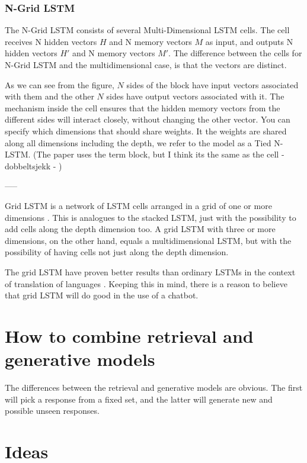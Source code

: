 \documentclass{article} %
\begin{document}
\subsubsection{N-Grid LSTM}
The N-Grid LSTM consists of several Multi-Dimensional LSTM cells. The cell receives N hidden vectors $H$ and N memory vectors $M$ as input, and outputs N hidden vectors $H'$ and N memory vectors $M'$. The difference between the cells for N-Grid LSTM and the multidimensional case, is that the vectors are distinct. 

As we can see from the figure, $N$ sides of the block have input vectors associated with them and the other $N$ sides have output vectors associated with it. The mechanism inside the cell ensures that the hidden memory vectors from the different sides will interact closely, without changing the other vector. You can specify which dimensions that should share weights. It the weights are shared along all dimensions including the depth, we refer to the model as a Tied N-LSTM.
(The paper uses the term block, but I think its the same as the cell - dobbeltsjekk - ) 

-----

Grid LSTM is a network of LSTM cells arranged in a grid of one or more dimensions \cite{gridLSTM}. This is analogues to the stacked LSTM, just with the possibility to add cells along the depth dimension too. A grid LSTM with three or more dimensions, on the other hand, equals a multidimensional LSTM, but with the possibility of having cells not just along the depth dimension.

The grid LSTM have proven better results than ordinary LSTMs in the context of translation of languages \cite{gridLSTM}. Keeping this in mind, there is a reason to believe that grid LSTM will do good in the use of a chatbot.



\section{How to combine retrieval and generative models}

The differences between the retrieval and generative models are obvious. The first will pick a response from a fixed set, and the latter will generate new and possible unseen responses. 

\section{Ideas}
\end{document}
